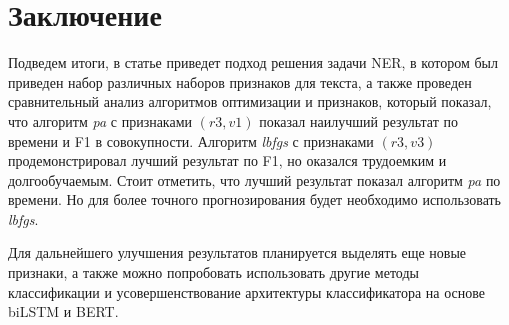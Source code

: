\documentclass{csmathnotes}
\begin{document}
\section*{Заключение}
Подведем итоги, в статье приведет подход решения задачи NER, в котором был приведен набор различных наборов признаков для текста, а также проведен сравнительный анализ алгоритмов оптимизации и признаков, который показал, что алгоритм \emph{pa} с признаками $(r3, v1)$ показал наилучший результат по времени и F1 в совокупности. Алгоритм \emph{lbfgs}  с признаками $(r3, v3)$ продемонстрировал лучший результат по F1, но оказался трудоемким и долгообучаемым. Стоит отметить, что лучший результат показал алгоритм \emph{pa} по времени. Но для более точного прогнозирования будет необходимо использовать \emph{lbfgs}.


Для дальнейшего улучшения результатов планируется выделять еще новые признаки, а также можно попробовать использовать другие методы классификации и усовершенствование архитектуры классификатора на основе biLSTM и BERT.

\printbibliography
\end{document}
